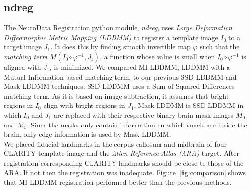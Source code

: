 \documentclass[simplex.tex]{subfiles}
\begin{document}
\subsection{ndreg}


The NeuroData Registration python module, \textit{ndreg}, uses \textit{Large Deformation Diffeomorphic Metric Mapping (LDDMM)} to register a template image $I_0$ to a target image $J_1$.
It does this by finding smooth invertible map $\varphi$ such that the \textit{matching term} $M(I_0 \circ \varphi^{-1}, J_1)$, a function whose value is small when $I_0 \circ \varphi^{-1}$ is aligned with $J_1$, is minimized.
We compared MI-LDDMM, LDDMM with a Mutual Information based matching term, to our previous SSD-LDDMM and Mask-LDDMM techniques.
SSD-LDDMM uses a Sum of Squared Differences matching term.
As it is based on image subtraction, it assumes that bright regions in $I_0$ align with bright regions in $J_1$.
Mask-LDDMM is SSD-LDDMM in which $I_0$ and $J_1$ are replaced with their respective binary brain mask images $M_0$ and $M_1$.
Since the masks only contain information on which voxels are inside the brain, only edge information is used by Mask-LDDMM.
\\
We placed fiducial landmarks in the corpus callosum and midbrain of four CLARITY template image and the \textit{Allen Reference Atlas (ARA)} target.
After registration corresponding CLARITY landmarks should be close to those of the ARA. 
If not then the registration was inadequate.
Figure~\ref{fig:comparison} shows that MI-LDDMM registration performed better than the previous methods.
\end{document}

